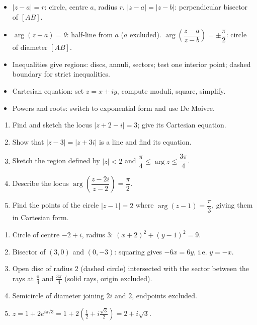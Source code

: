 \documentclass[11pt]{article}
\begin{document}
\begin{aretenir}
\begin{itemize}
\item $|z - a| = r$: circle, centre $a$, radius $r$. $|z - a| = |z - b|$: perpendicular bisector of $[AB]$.
\item $\arg(z - a) = \theta$: half-line from $a$ ($a$ excluded). $\arg\!\left(\dfrac{z-a}{z-b}\right) = \pm\dfrac{\pi}{2}$: circle of diameter $[AB]$.
\item Inequalities give regions: discs, annuli, sectors; test one interior point; dashed boundary for strict inequalities.
\item Cartesian equation: set $z = x + iy$, compute moduli, square, simplify.
\item Powers and roots: switch to exponential form and use De Moivre.
\end{itemize}
\end{aretenir}

\begin{exercice}[Practice]
\begin{enumerate}
\item Find and sketch the locus $|z + 2 - i| = 3$; give its Cartesian equation.
\item Show that $|z - 3| = |z + 3i|$ is a line and find its equation.
\item Sketch the region defined by $|z| < 2$ and $\dfrac{\pi}{4} \leq \arg z \leq \dfrac{3\pi}{4}$.
\item Describe the locus $\arg\!\left(\dfrac{z - 2i}{z - 2}\right) = \dfrac{\pi}{2}$.
\item Find the points of the circle $|z - 1| = 2$ where $\arg(z - 1) = \dfrac{\pi}{3}$, giving them in Cartesian form.
\end{enumerate}
\end{exercice}

\begin{corrige}[Exercise 1]
\begin{enumerate}
\item Circle of centre $-2 + i$, radius $3$: $(x+2)^2 + (y-1)^2 = 9$.
\item Bisector of $(3,0)$ and $(0,-3)$: squaring gives $-6x = 6y$, i.e. $y = -x$.
\item Open disc of radius $2$ (dashed circle) intersected with the sector between the rays at $\frac{\pi}{4}$ and $\frac{3\pi}{4}$ (solid rays, origin excluded).
\item Semicircle of diameter joining $2i$ and $2$, endpoints excluded.
\item $z = 1 + 2e^{i\pi/3} = 1 + 2\left(\frac{1}{2} + i\frac{\sqrt{3}}{2}\right) = 2 + i\sqrt{3}$.
\end{enumerate}
\end{corrige}
\end{document}
